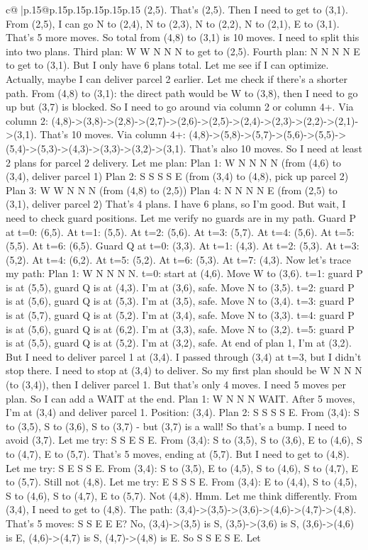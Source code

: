 \documentclass{article}
\begin{document}
{\begin{supertabular}{c@{$\;$}|p{.15\linewidth}@{}p{.15\linewidth}p{.15\linewidth}p{.15\linewidth}p{.15\linewidth}p{.15\linewidth}}
{{{(2,5). That's (2,5). Then I need to get to (3,1). From (2,5), I can go N to (2,4), N to (2,3), N to (2,2), N to (2,1), E to (3,1). That's 5 more moves. So total from (4,8) to (3,1) is 10 moves. I need to split this into two plans. Third plan: W W N N N to get to (2,5). Fourth plan: N N N N E to get to (3,1). But I only have 6 plans total. Let me see if I can optimize. Actually, maybe I can deliver parcel 2 earlier. Let me check if there's a shorter path. From (4,8) to (3,1): the direct path would be W to (3,8), then I need to go up but (3,7) is blocked. So I need to go around via column 2 or column 4+. Via column 2: (4,8){-}>(3,8){-}>(2,8){-}>(2,7){-}>(2,6){-}>(2,5){-}>(2,4){-}>(2,3){-}>(2,2){-}>(2,1){-}>(3,1). That's 10 moves. Via column 4+: (4,8){-}>(5,8){-}>(5,7){-}>(5,6){-}>(5,5){-}>(5,4){-}>(5,3){-}>(4,3){-}>(3,3){-}>(3,2){-}>(3,1). That's also 10 moves. So I need at least 2 plans for parcel 2 delivery. Let me plan: Plan 1: W N N N N (from (4,6) to (3,4), deliver parcel 1) Plan 2: S S S S E (from (3,4) to (4,8), pick up parcel 2) Plan 3: W W N N N (from (4,8) to (2,5)) Plan 4: N N N N E (from (2,5) to (3,1), deliver parcel 2) That's 4 plans. I have 6 plans, so I'm good. But wait, I need to check guard positions. Let me verify no guards are in my path. Guard P at t=0: (6,5). At t=1: (5,5). At t=2: (5,6). At t=3: (5,7). At t=4: (5,6). At t=5: (5,5). At t=6: (6,5). Guard Q at t=0: (3,3). At t=1: (4,3). At t=2: (5,3). At t=3: (5,2). At t=4: (6,2). At t=5: (5,2). At t=6: (5,3). At t=7: (4,3). Now let's trace my path: Plan 1: W N N N N. t=0: start at (4,6). Move W to (3,6). t=1: guard P is at (5,5), guard Q is at (4,3). I'm at (3,6), safe. Move N to (3,5). t=2: guard P is at (5,6), guard Q is at (5,3). I'm at (3,5), safe. Move N to (3,4). t=3: guard P is at (5,7), guard Q is at (5,2). I'm at (3,4), safe. Move N to (3,3). t=4: guard P is at (5,6), guard Q is at (6,2). I'm at (3,3), safe. Move N to (3,2). t=5: guard P is at (5,5), guard Q is at (5,2). I'm at (3,2), safe. At end of plan 1, I'm at (3,2). But I need to deliver parcel 1 at (3,4). I passed through (3,4) at t=3, but I didn't stop there. I need to stop at (3,4) to deliver. So my first plan should be W N N N (to (3,4)), then I deliver parcel 1. But that's only 4 moves. I need 5 moves per plan. So I can add a WAIT at the end. Plan 1: W N N N WAIT. After 5 moves, I'm at (3,4) and deliver parcel 1. Position: (3,4). Plan 2: S S S S E. From (3,4): S to (3,5), S to (3,6), S to (3,7) {-} but (3,7) is a wall! So that's a bump. I need to avoid (3,7). Let me try: S S E S E. From (3,4): S to (3,5), S to (3,6), E to (4,6), S to (4,7), E to (5,7). That's 5 moves, ending at (5,7). But I need to get to (4,8). Let me try: S E S S E. From (3,4): S to (3,5), E to (4,5), S to (4,6), S to (4,7), E to (5,7). Still not (4,8). Let me try: E S S S E. From (3,4): E to (4,4), S to (4,5), S to (4,6), S to (4,7), E to (5,7). Not (4,8). Hmm. Let me think differently. From (3,4), I need to get to (4,8). The path: (3,4){-}>(3,5){-}>(3,6){-}>(4,6){-}>(4,7){-}>(4,8). That's 5 moves: S S E E E? No, (3,4){-}>(3,5) is S, (3,5){-}>(3,6) is S, (3,6){-}>(4,6) is E, (4,6){-}>(4,7) is S, (4,7){-}>(4,8) is E. So S S E S E. Let }}}
\end{supertabular}}
\end{document}

